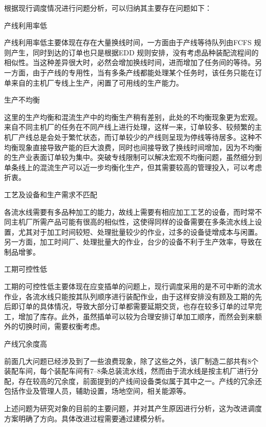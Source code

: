 根据现行调度情况进行问题分析，可以归纳其主要存在问题如下：
\renewcommand{\labelenumi}{(\theenumi)}
\begin{asparaenum}
\item 产线利用率低

产线利用率低主要体现在存在大量换线时间，一方面由于产线等待队列由FCFS 规则产生，同时到达的订单也只是根据EDD 规则安排，没有考虑品种装配流程间的相似性。当这种差异很大时，必然会增加换线时间，进而增加了任务间的等待。另一方面，由于产线的专用性，当有多条产线都能处理某个任务时，该任务只能在订单来自的主机厂专线上生产，闲置了可用线的生产能力。
\item 生产不均衡

这里的生产均衡和混流生产中的均衡生产稍有差别，此处的不均衡现象更为宏观。来自不同主机厂的任务在不同产线上进行处理，这样一来，订单较多、较频繁的主机厂产线总是会处于繁忙状态，而订单较少的产线则呈现为停线等待居多。这种不均衡现象直接导致产能的巨大浪费，同时也间接导致了换线时间增加，因为不均衡的生产业表面订单较为集中。突破专线限制可以解决宏观不均衡问题，虽然细分到单条线上的混流生产可以近一步均衡化生产，但其需要较高的管理投入，可以考虑折衷。
\item 工艺及设备和生产需求不匹配

各流水线需要有多品种加工的能力，故线上需要有相应加工工艺的设备，而时常不同主机厂所需产品可能有很高的相似性，这使得同样的设备需要在多条流水线上设置，尤其对于加工时间较短、处理批量较少的作业，过多的设备徒增成本与闲置。另一方面，加工时间厂、处理批量大的作业，台少的设备不利于生产效率，导致在制品增爹。
\item 工期可控性低

工期的可控性低主要体现在应变插单的问题上，现行调度采用的是不可中断的流水作业，各流水线只能按其队列顺序进行装配作业，由于这样安排没有顾及工期的先后即订单的具体情况，导致大部分订单都需要延期交货，也存在较多订单的过早完工，增加了库存。此外，虽然插单可以较为合理安排订单加工顺序，而然会到来额外的切换时间，需要权衡考虑。
\item 产线冗余度高
\end{asparaenum}

前面几大问题已经涉及到了一些浪费现象，除了这些之外，该厂制造二部共有8个装配车间，每个装配车间有7--8条总装流水线，然而由于流水线是按主机厂进行分配，存在较高的冗余度，前面提到的产线间设备类似属于其中之一。产线的冗余还包括作业及管理人员，辅助设置，场地空间，相关能源等。

上述问题为研究对象的目前的主要问题，并对其产生原因进行分析，这为改进调度方案明确了方向。具体改进过程需要通过建模分析。

